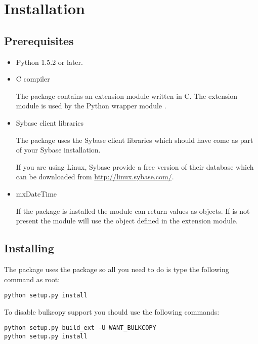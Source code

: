 \section{Installation}

\subsection{Prerequisites}

\begin{itemize}
\item Python 1.5.2 or later.

\item C compiler

The  package contains an extension module written in C.
The extension module is used by the Python wrapper module
.

\item Sybase client libraries

The  package uses the Sybase client libraries which
should have come as part of your Sybase installation.

If you are using Linux, Sybase provide a free version of their
database which can be downloaded from \url{http://linux.sybase.com/}.

\item mxDateTime

If the  package is installed the 
module can return  values as  objects.
If  is not present the module will use the
 object defined in the  extension
module.
\end{itemize}
\subsection{Installing}

The  package uses the  package so all
you need to do is type the following command as root:

\begin{verbatim}
python setup.py install
\end{verbatim}

To disable bulkcopy support you should use the following commands:

\begin{verbatim}
python setup.py build_ext -U WANT_BULKCOPY
python setup.py install
\end{verbatim}

